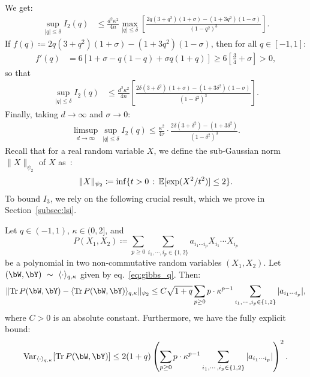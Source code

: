We get: 
\begin{align*}
    \sup_{|q| \leq \delta} I_2(q) &\leq \frac{d^2 \kappa^2}{4n} \max_{|q| \leq \delta }\left[\frac{2q(3+q^2) (1+\sigma) - (1+3q^2) (1-\sigma)}{(1-q^2)^3}\right].
\end{align*}
If $f(q) \coloneqq 2q(3+q^2) (1+\sigma) - (1+3q^2) (1-\sigma)$, then for all $q \in [-1,1]$:
\begin{align}\label{eq:fprime_q}
    f'(q) &= 6 [1+\sigma - q (1-q) + \sigma q (1+q)] \geq 6 \left[\frac{3}{4}+\sigma\right] > 0,
\end{align}
so that 
\begin{align*}
    \sup_{|q| \leq \delta} I_2(q) &\leq \frac{d^2 \kappa^2}{4n} \left[\frac{2\delta(3+\delta^2) (1+\sigma) - (1+3\delta^2) (1-\sigma)}{(1-\delta^2)^3}\right].
\end{align*}
Finally, taking $d \to \infty$ and $\sigma \to 0$:
\begin{align}\label{eq:ub_I2}
    \limsup_{d \to \infty} \sup_{|q| \leq \delta} I_2(q) \leq \frac{\kappa^2}{4\tau} \cdot \frac{2 \delta(3+\delta^2) - (1+3\delta^2)}{(1-\delta^2)^3}.
\end{align}
Recall that for a real random variable $X$, we define the sub-Gaussian norm $\|X\|_{\psi_2}$ of $X$ as~\citep{vershynin2018high}:
\begin{align*}
    \|X\|_{\psi_2} \coloneqq \inf \{t > 0 \, : \, \mathbb{E}[\exp(X^2/t^2)] \leq 2\}. 
\end{align*}
To bound $I_3$, we rely on the following crucial result, which we prove in Section~\ref{subsec:lsi}.
\begin{lemma}
    \label{lemma:conc_moments_Pqkappa}
    Let $q \in (-1,1)$, $\kappa \in (0,2]$, and 
    \begin{equation*}
    P(X_1, X_2) \coloneqq \sum_{p\geq 0}\sum_{i_1, \cdots, i_p \in \{1,2\}} a_{i_1 \cdots i_p} X_{i_1} \cdots X_{i_p}
    \end{equation*}
    be a polynomial 
    in two non-commutative random variables $(X_1, X_2)$.
    Let $(\bW, \bY)~\sim~\langle \cdot \rangle_{q,\kappa}$ given by eq.~\eqref{eq:gibbs_q}.
    Then: 
    \begin{equation*}
    \|\Tr \, P(\bW, \bY) - \langle \Tr \, P(\bW, \bY) \rangle_{q,\kappa} \|_{\psi_2} \leq C \sqrt{1+q} 
    \sum_{p\geq 0} p \cdot \kappa^{p-1}\sum_{i_1, \cdots, i_p \in \{1,2\}} |a_{i_1 \cdots i_p}|,
    \end{equation*}
    where $C > 0$ is an absolute constant. Furthermore, we have the fully explicit bound:
    \begin{equation}\label{eq:var_PWY}
        \Var_{\langle \cdot \rangle_{q,\kappa}} [\Tr \, P(\bW, \bY)] \leq 
         2(1+q)
        \left(\sum_{p\geq 0} p \cdot \kappa^{p-1}\sum_{i_1, \cdots, i_p \in \{1,2\}} |a_{i_1 \cdots i_p}|\right)^2.
    \end{equation}
\end{lemma}
